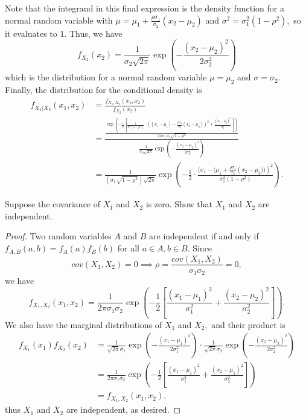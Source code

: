 \documentclass{article}
\begin{document}
\begin{enumerate}
\begin{enumerate}
\begin{soln}
				Note that the integrand in this final expression is the density function for a normal random variable with $\mu=\mu_1+\frac{\rho\sigma_1}{\sigma_2}(x_2-\mu_2)$ and $\sigma^2=\sigma_1^2(1-\rho^2),$ so it evaluates to 1. Thus, we have \[f_{X_2}(x_2) = \frac{1}{\sigma_2\sqrt{2\pi}}\exp{\left( -\frac{(x_2-\mu_2)^2}{2\sigma_2^2} \right)}\] which is the distribution for a normal random variable $\mu=\mu_2$ and $\sigma=\sigma_2.$ Finally, the distribution for the conditional density is 
				\begin{align*}
					f_{X_1|X_2}(x_1, x_2) &= \frac{f_{X_1, X_2}(x_1, x_2)}{f_{X_2}(x_2)} \\
					&= \frac{\frac{\exp{\left(-\frac{1}{2}\left[ \frac{1}{\sigma_1^2(1-\rho^2)}\cdot\left( (x_1-\mu_1)-\frac{\rho\sigma_1}{\sigma_2}(x_2-\mu_2) \right)^2 + \frac{(x_2-\mu_2)^2}{\sigma_2^2} \right]\right)}}{2\pi\sigma_1\sigma_2\sqrt{1-\rho^2}}}{\frac{1}{\sigma_2\sqrt{2\pi}}\exp{\left( -\frac{(x_2-\mu_2)^2}{2\sigma_2^2} \right)}} \\
					&= \boxed{\frac{1}{\left(\sigma_1\sqrt{1-\rho^2}\right)\sqrt{2\pi}}\exp{\left( -\frac{1}{2}\cdot\frac{(x_1-(\mu_1+\frac{\rho\sigma_1}{\sigma_2}\left(x_2-\mu_2))\right)^2}{\sigma_1^2(1-\rho^2)} \right)}.}
				\end{align*}
			\end{soln}

		\ii Suppose the covariance of $X_1$ and $X_2$ is zero. Show that $X_1$ and $X_2$ are independent.
			\begin{proof}
				Two random variables $A$ and $B$ are independent if and only if $f_{A, B}(a, b) = f_A(a) f_B(b)$ for all $a\in A, b\in B.$ Since \[cov(X_1, X_2)=0\implies \rho=\frac{cov(X_1, X_2)}{\sigma_1\sigma_2}=0, \] we have \[f_{X_1, X_2}(x_1, x_2) = \frac{1}{2\pi\sigma_1\sigma_2}\exp{\left(-\frac{1}{2}\left[ \frac{(x_1-\mu_1)^2}{\sigma_1^2} + \frac{(x_2-\mu_2)^2}{\sigma_2^2} \right]\right)}. \] We also have the marginal distributions of $X_1$ and $X_2,$ and their product is 
				\begin{align*}
					f_{X_1}(x_1)f_{X_2}(x_2)&=\frac{1}{\sqrt{2\pi}\sigma_1}\exp{\left( -\frac{(x_1-\mu_1)^2}{2\sigma_1^2} \right)} \cdot \frac{1}{\sqrt{2\pi}\sigma_2}\exp{\left( -\frac{(x_2-\mu_2)^2}{2\sigma_2^2} \right)} \\
					&= \frac{1}{2\pi\sigma_1\sigma_2}\exp{\left(-\frac{1}{2}\left[ \frac{(x_1-\mu_1)^2}{\sigma_1^2} + \frac{(x_2-\mu_2)^2}{\sigma_2^2} \right]\right)} \\
				&= f_{X_1, X_2}(x_1, x_2),
				\end{align*} thus $X_1$ and $X_2$ are independent, as desired.


\end{proof}
\end{enumerate}
\end{enumerate}
\end{document}
